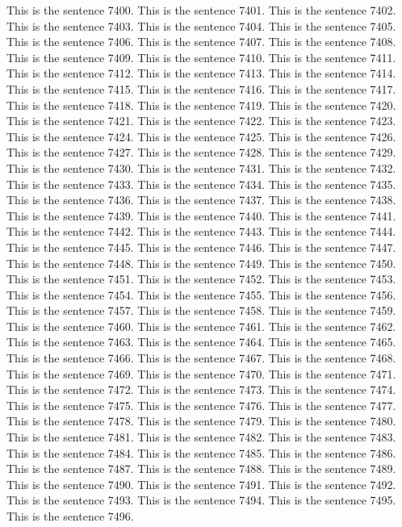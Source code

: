 \documentclass{article}
\begin{document}
This is the sentence 7400.
This is the sentence 7401.
This is the sentence 7402.
This is the sentence 7403.
This is the sentence 7404.
This is the sentence 7405.
This is the sentence 7406.
This is the sentence 7407.
This is the sentence 7408.
This is the sentence 7409.
This is the sentence 7410.
This is the sentence 7411.
This is the sentence 7412.
This is the sentence 7413.
This is the sentence 7414.
This is the sentence 7415.
This is the sentence 7416.
This is the sentence 7417.
This is the sentence 7418.
This is the sentence 7419.
This is the sentence 7420.
This is the sentence 7421.
This is the sentence 7422.
This is the sentence 7423.
This is the sentence 7424.
This is the sentence 7425.
This is the sentence 7426.
This is the sentence 7427.
This is the sentence 7428.
This is the sentence 7429.
This is the sentence 7430.
This is the sentence 7431.
This is the sentence 7432.
This is the sentence 7433.
This is the sentence 7434.
This is the sentence 7435.
This is the sentence 7436.
This is the sentence 7437.
This is the sentence 7438.
This is the sentence 7439.
This is the sentence 7440.
This is the sentence 7441.
This is the sentence 7442.
This is the sentence 7443.
This is the sentence 7444.
This is the sentence 7445.
This is the sentence 7446.
This is the sentence 7447.
This is the sentence 7448.
This is the sentence 7449.
This is the sentence 7450.
This is the sentence 7451.
This is the sentence 7452.
This is the sentence 7453.
This is the sentence 7454.
This is the sentence 7455.
This is the sentence 7456.
This is the sentence 7457.
This is the sentence 7458.
This is the sentence 7459.
This is the sentence 7460.
This is the sentence 7461.
This is the sentence 7462.
This is the sentence 7463.
This is the sentence 7464.
This is the sentence 7465.
This is the sentence 7466.
This is the sentence 7467.
This is the sentence 7468.
This is the sentence 7469.
This is the sentence 7470.
This is the sentence 7471.
This is the sentence 7472.
This is the sentence 7473.
This is the sentence 7474.
This is the sentence 7475.
This is the sentence 7476.
This is the sentence 7477.
This is the sentence 7478.
This is the sentence 7479.
This is the sentence 7480.
This is the sentence 7481.
This is the sentence 7482.
This is the sentence 7483.
This is the sentence 7484.
This is the sentence 7485.
This is the sentence 7486.
This is the sentence 7487.
This is the sentence 7488.
This is the sentence 7489.
This is the sentence 7490.
This is the sentence 7491.
This is the sentence 7492.
This is the sentence 7493.
This is the sentence 7494.
This is the sentence 7495.
This is the sentence 7496.
\end{document}
